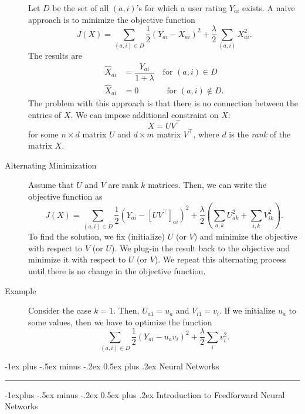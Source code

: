 \documentclass[10pt,landscape,a4paper]{article}
\makeatletter
\renewcommand{\section}{\@startsection{section}{1}{0mm}%
                                {-1ex plus -.5ex minus -.2ex}%
                                {0.5ex plus .2ex}%
                                {\normalfont\large\bfseries}}
\renewcommand{\subsection}{\@startsection{subsection}{2}{0mm}%
                                {-1explus -.5ex minus -.2ex}%
                                {0.5ex plus .2ex}%
                                {\normalfont\normalsize\bfseries}}
\makeatother
\begin{document}
\begin{multicols*}{3}
\begin{description}
	Let $D$ be the set of all $(a,i)$'s for which a user rating $Y_{ai}$ exists. A naive approach is to minimize the objective function
	$$J(X)=\sum_{(a,i)\in D}\frac{1}{2}\left(Y_{ai}-X_{ai}\right)^2+\frac{\lambda}{2}\sum_{(a,i)}X_{ai}^2.$$
	The results are
	\begin{align*}
		\widehat{X}_{ai}&=\dfrac{Y_{ai}}{1+\lambda}\quad\text{for }(a,i)\in D\\
		\widehat{X}_{ai}&=0\qquad\quad\;\,\text{for }(a,i)\notin D.
	\end{align*}
	The problem with this approach is that there is no connection between the entries of $X$. We can impose additional constraint on $X$: $$X=UV^\intercal$$
	for some $n\times d$ matrix $U$ and $d\times m$ matrix $V^\intercal$, where $d$ is the {\it rank} of the matrix $X$.
	\item[Alternating Minimization] Assume that $U$ and $V$ are rank $k$ matrices. Then, we can write the objective function as
	$$J(X)=\sum_{(a,i)\in D}\frac{1}{2}\left(Y_{ai}-\left[UV^\intercal\right]_{ai}\right)^2+\frac{\lambda}{2}\left(\sum_{a,k}U_{ak}^2+\sum_{i,k}V_{ik}^2\right).$$
	To find the solution, we fix (initialize) $U$ (or $V$) and minimize the objective with respect to $V$ (or $U$). We plug-in the result back to the objective and minimize it with respect to $U$ (or $V$). We repeat this alternating process until there is no change in the objective function.
	\item[Example] Consider the case $k=1$. Then, $U_{a1}=u_a$ and $V_{i1}=v_i$. If we initialize $u_a$ to some values, then we have to optimize the function
	$$\sum_{(a,i)\in D}\frac{1}{2}\left(Y_{ai}-u_av_i\right)^2+\frac{\lambda}{2}\sum_{i}v_{i}^2.$$
\end{description}

\section{Neural Networks}\smallskip \hrule height 1pt \smallskip

\subsection{Introduction to Feedforward Neural Networks}


\end{multicols*}
\end{document}
